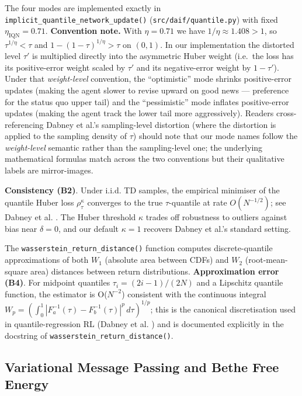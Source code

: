 \documentclass[
]{article}
\begin{document}
The four modes are implemented exactly in
\texttt{implicit\_quantile\_network\_update()}
(\texttt{src/daif/quantile.py}) with fixed
\(\eta_{\mathrm{IQN}} = 0.71\). \textbf{Convention note.} With
\(\eta = 0.71\) we have \(1/\eta \approx 1.408 > 1\), so
\(\tau^{1/\eta} < \tau\) and \(1-(1-\tau)^{1/\eta} > \tau\) on
\((0,1)\). In our implementation the distorted level \(\tau'\) is
multiplied directly into the asymmetric Huber weight (i.e.~the loss has
its positive-error weight scaled by \(\tau'\) and its negative-error
weight by \(1-\tau'\)). Under that \emph{weight-level} convention, the
``optimistic'' mode shrinks positive-error updates (making the agent
slower to revise upward on good news --- preference for the status quo
upper tail) and the ``pessimistic'' mode inflates positive-error updates
(making the agent track the lower tail more aggressively). Readers
cross-referencing Dabney et al.'s \citeyearpar{dabney2018distributional}
sampling-level distortion (where the distortion is applied to the
sampling density of \(\tau\)) should note that our mode names follow the
\emph{weight-level} semantic rather than the sampling-level one; the
underlying mathematical formulas match across the two conventions but
their qualitative labels are mirror-images.

\textbf{Consistency (B2)}. Under i.i.d. TD samples, the empirical
minimiser of the quantile Huber loss \(\rho_\tau^\kappa\) converges to
the true \(\tau\)-quantile at rate \(O(N^{-1/2})\); see Dabney et al.
\citeyearpar[Theorem 2]{dabney2018distributional}. The Huber threshold
\(\kappa\) trades off robustness to outliers against bias near
\(\delta=0\), and our default \(\kappa=1\) recovers Dabney et al.'s
standard setting.

The \texttt{wasserstein\_return\_distance()} function computes
discrete-quantile approximations of both \(W_1\) (absolute area between
CDFs) and \(W_2\) (root-mean-square area) distances between return
distributions. \textbf{Approximation error (B4)}. For midpoint quantiles
\(\tau_i = (2i-1)/(2N)\) and a Lipschitz quantile function, the
estimator is O(\(N^{-2}\)) consistent with the continuous integral
\(W_p = (\int_0^1 |F_a^{-1}(\tau) - F_b^{-1}(\tau)|^p\,d\tau)^{1/p}\);
this is the canonical discretisation used in quantile-regression RL
(Dabney et al. \citeyearpar{dabney2018distributional}) and is documented
explicitly in the docstring of \texttt{wasserstein\_return\_distance()}.

\subsection{Variational Message Passing and Bethe Free
Energy}\label{sec:daif-vmp}
\end{document}
